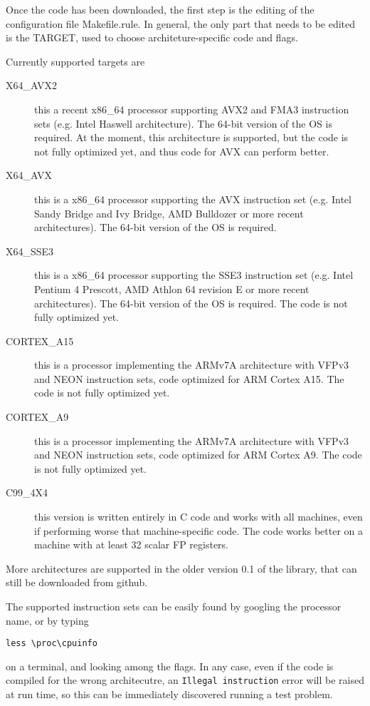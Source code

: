 \documentclass[a4paper]{report}
\begin{document}
Once the code has been downloaded, the first step is the editing of the configuration file Makefile.rule.
In general, the only part that needs to be edited is the TARGET, used to choose architeture-specific code and flags.

Currently supported targets are
\begin{description}
\item[X64\_AVX2] this a recent x86\_64 processor supporting AVX2 and FMA3 instruction sets (e.g. Intel Haswell architecture). The 64-bit version of the OS is required. At the moment, this architecture is supported, but the code is not fully optimized yet, and thus code for AVX can perform better.
\item[X64\_AVX] this is a x86\_64 processor supporting the AVX instruction set (e.g. Intel Sandy Bridge and Ivy Bridge, AMD Bulldozer or more recent architectures). The 64-bit version of the OS is required.
\item[X64\_SSE3] this is a x86\_64 processor supporting the SSE3 instruction set (e.g. Intel Pentium 4 Prescott, AMD Athlon 64 revision E or more recent architectures). The 64-bit version of the OS is required. The code is not fully optimized yet.
\item[CORTEX\_A15] this is a processor implementing the ARMv7A architecture with VFPv3 and NEON instruction sets, code optimized for ARM Cortex A15. The code is not fully optimized yet.
\item[CORTEX\_A9] this is a processor implementing the ARMv7A architecture with VFPv3 and NEON instruction sets, code optimized for ARM Cortex A9. The code is not fully optimized yet.
\item[C99\_4X4] this version is written entirely in C code and works with all machines, even if performing worse that machine-specific code. The code works better on a machine with at least 32 scalar FP registers.
\end{description}
More architectures are supported in the older version 0.1 of the library, that can still be downloaded from github.

The supported instruction sets can be easily found by googling the processor name, or by typing
\begin{verbatim}
less \proc\cpuinfo
\end{verbatim}
on a terminal, and looking among the flags. 
In any case, even if the code is compiled for the wrong architecutre, an {\tt Illegal instruction} error will be raised at run time, so this can be immediately discovered running a test problem.
\end{document}
